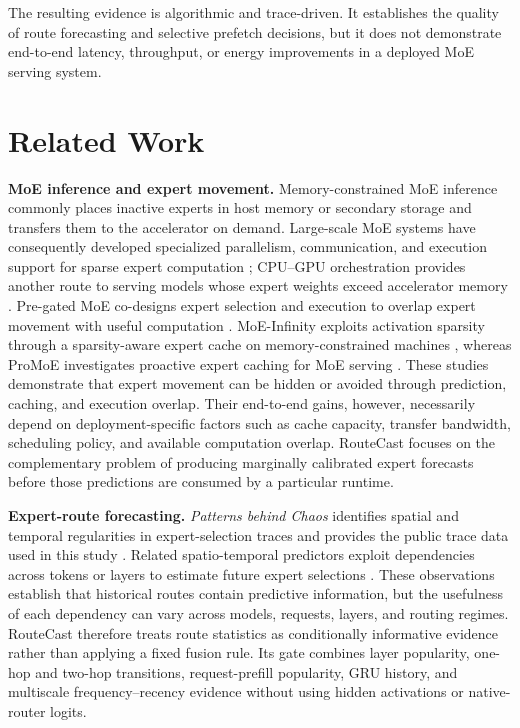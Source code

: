 \documentclass[conference]{IEEEtran}
\begin{document}
The resulting evidence is algorithmic and trace-driven. It establishes the
quality of route forecasting and selective prefetch decisions, but it does not
demonstrate end-to-end latency, throughput, or energy improvements in a
deployed MoE serving system.


\section{Related Work}

\textbf{MoE inference and expert movement.}
Memory-constrained MoE inference commonly places inactive experts in host
memory or secondary storage and transfers them to the accelerator on demand.
Large-scale MoE systems have consequently developed specialized parallelism,
communication, and execution support for sparse expert computation
\cite{deepspeedmoe,tutel}; CPU--GPU orchestration provides another route to
serving models whose expert weights exceed accelerator memory
\cite{fiddler}.
Pre-gated MoE co-designs expert selection and execution to overlap expert
movement with useful computation \cite{pregated}. MoE-Infinity exploits
activation sparsity through a sparsity-aware expert cache on
memory-constrained machines \cite{moeinfinity}, whereas ProMoE investigates
proactive expert caching for MoE serving \cite{promoe}. These studies
demonstrate that expert movement can be hidden or avoided through prediction,
caching, and execution overlap. Their end-to-end gains, however, necessarily
depend on deployment-specific factors such as cache capacity, transfer
bandwidth, scheduling policy, and available computation overlap. RouteCast
focuses on the complementary problem of producing marginally calibrated expert forecasts
before those predictions are consumed by a particular runtime.

\textbf{Expert-route forecasting.}
\emph{Patterns behind Chaos} identifies spatial and temporal regularities in
expert-selection traces and provides the public trace data used in this study
\cite{patterns}. Related spatio-temporal predictors exploit dependencies
across tokens or layers to estimate future expert selections \cite{stmoe}.
These observations establish that historical routes contain predictive
information, but the usefulness of each dependency can vary across models,
requests, layers, and routing regimes. RouteCast therefore treats route
statistics as conditionally informative evidence rather than applying a fixed
fusion rule. Its gate combines layer popularity, one-hop and two-hop
transitions, request-prefill popularity, GRU history, and multiscale
frequency--recency evidence without using hidden activations or native-router
logits.
\end{document}

